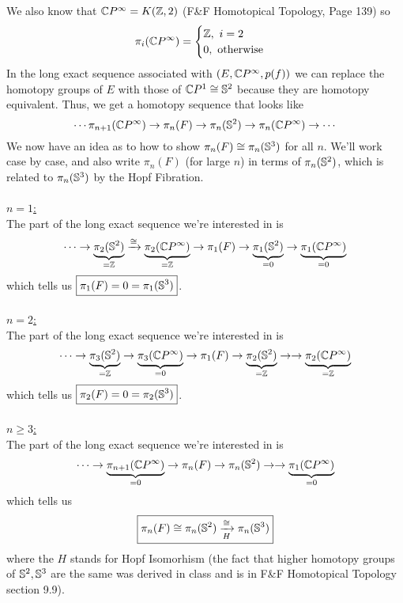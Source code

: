 \documentclass[11pt]{article}
\begin{document}
We also know that $\mathbb{C} P^{\infty} = K(\mathbb{Z}, 2)$ (F\&F Homotopical Topology, Page 139) so $$ \pi_i(\mathbb{C} P^{\infty}) = \begin{cases}
  \mathbb{Z}, ~i = 2 \\
  0, \text{ otherwise}
\end{cases} $$ In the long exact sequence associated with $(E, \mathbb{C} P^{\infty}, p(f))$ we can replace the homotopy groups of $E$ with those of $\mathbb{C} P^1 \cong \mathbb{S}^2$ because they are homotopy equivalent. Thus, we get a homotopy sequence that looks like $$ \cdots {\pi_{n+1}(\mathbb{C}P^{\infty})}\rightarrow \pi_n(F) \rightarrow \pi_n(\mathbb{S}^2) \rightarrow {\pi_n(\mathbb{C}P^{\infty})} \rightarrow \cdots $$  We now have an idea as to how to show $\pi_n(F) \cong \pi_n(\mathbb{S}^3)$ for all $n$. We'll work case by case, and also write $\pi_n(F)$ (for large $n$) in terms of $\pi_n(\mathbb{S}^2)$, which is related to $\pi_n(\mathbb{S}^3)$ by the Hopf Fibration. 
\\
\\
\underline{$n = 1$:} \\
The part of the long exact sequence we're interested in is 
$$ \cdots \rightarrow \underbrace{\pi_2(\mathbb{S}^2)}_{=\mathbb{Z}} \xrightarrow{\cong} \underbrace{\pi_2(\mathbb{C} P^{\infty})}_{=\mathbb{Z}} \rightarrow \pi_1(F) \rightarrow \underbrace{\pi_1(\mathbb{S}^2)}_{=0} \rightarrow \underbrace{\pi_1(\mathbb{C} P^{\infty})}_{=0} $$
which tells us $\boxed{\pi_1(F) = 0 = \pi_1(\mathbb{S}^3)}$.
\\
\\
\underline{$n = 2$:} \\
The part of the long exact sequence we're interested in is 
$$ \cdots \rightarrow \underbrace{\pi_3(\mathbb{S}^2)}_{=\mathbb{Z}} \rightarrow \underbrace{\pi_3(\mathbb{C} P^{\infty})}_{=0} \rightarrow \pi_1(F) \rightarrow \underbrace{\pi_2(\mathbb{S}^2)}_{=\mathbb{Z}} \rightarrow \rightarrow \underbrace{\pi_2(\mathbb{C} P^{\infty})}_{=\mathbb{Z}} $$
which tells us $\boxed{\pi_2(F) = 0 = \pi_2(\mathbb{S}^3)}$.
\\
\\
\underline{$n \geq 3$:}\\
The part of the long exact sequence we're interested in is 
$$ \cdots 
\rightarrow \underbrace{\pi_{n+1}(\mathbb{C} P^{\infty})}_{=0} \rightarrow \pi_n(F) \rightarrow {\pi_n(\mathbb{S}^2)} \rightarrow \rightarrow \underbrace{\pi_1(\mathbb{C} P^{\infty})}_{=0} $$
which tells us $$\boxed{\pi_n(F) \cong \pi_n(\mathbb{S}^2) \xrightarrow[H]{\cong} \pi_n(\mathbb{S}^3)}$$ where the $H$ stands for Hopf Isomorhism (the fact that higher homotopy groups of $\mathbb{S}^2, \mathbb{S}^3$ are the same was derived in class and is in F\&F Homotopical Topology section 9.9).
\end{document}
